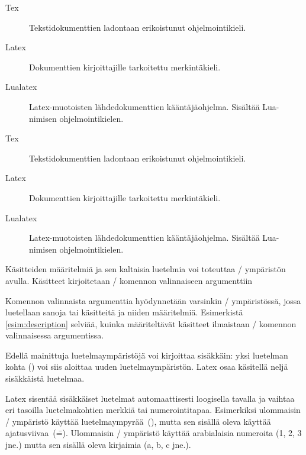 \begin{esimerkki*}

\begin{koodilohko}
  \begin{description}
  \item[Tex] Tekstidokumenttien ladontaan erikoistunut ohjelmointikieli.
  \item[Latex] Dokumenttien kirjoittajille tarkoitettu merkintäkieli.
  \item[Lualatex] Latex-muotoisten lähdedokumenttien kääntäjäohjelma.
    Sisältää Lua-nimisen ohjelmointikielen.
  \end{description}
\end{koodilohko}

\begin{tulos}
  \begin{description}
  \item[Tex] Tekstidokumenttien ladontaan erikoistunut ohjelmointikieli.
  \item[Latex] Dokumenttien kirjoittajille tarkoitettu merkintäkieli.
  \item[Lualatex] Latex-muotoisten lähdedokumenttien kääntäjäohjelma.
    Sisältää Lua-nimi\-sen ohjelmointikielen.
  \end{description}
\end{tulos}
\caption{Käsitteiden määritelmiä ja sen kaltaisia luetelmia voi
  toteuttaa \-/ ympäristön avulla. Käsitteet
  kirjoitetaan \-/ komennon valinnaiseen argumenttiin}
\label{esim:description}
\end{esimerkki*}

Komennon valinnaista argumenttia hyödynnetään varsinkin
\-/ ympäristössä, jossa luetellaan sanoja tai
käsitteitä ja niiden määritelmiä. Esimerkistä \ref{esim:description}
selviää, kuinka määriteltävät käsitteet ilmaistaan \-/
komennon valinnaisessa argumentissa.

Edellä mainittuja luetelmaympäristöjä voi kirjoittaa sisäkkäin: yksi
luetelman kohta () voi siis aloittaa uuden
luetelmaympäristön. Latex osaa käsitellä neljä sisäkkäistä luetelmaa.

Latex sisentää sisäkkäiset luetelmat automaattisesti loogisella tavalla
ja vaihtaa eri tasoilla luetelmakohtien merkkiä tai numerointitapaa.
Esimerkiksi ulommaisin \-/ ympäristö käyttää
luetelmaympyrää~(\textbullet), mutta sen sisällä oleva käyttää
ajatusviivaa~(\==). Ulommaisin \-/ ympäristö
käyttää arabialaisia numeroita (1, 2, 3 jne.) mutta sen sisällä oleva
kirjaimia (a, b, c jne.).


